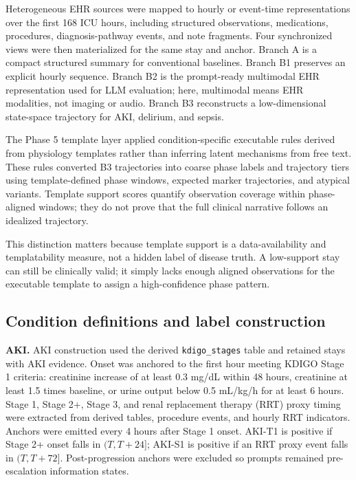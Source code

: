 \documentclass[pdflatex,sn-nature]{sn-jnl}
\begin{document}
Heterogeneous EHR sources were mapped to hourly or event-time representations over the first 168 ICU hours, including structured observations, medications, procedures, diagnosis-pathway events, and note fragments. Four synchronized views were then materialized for the same stay and anchor. Branch A is a compact structured summary for conventional baselines. Branch B1 preserves an explicit hourly sequence. Branch B2 is the prompt-ready multimodal EHR representation used for LLM evaluation; here, multimodal means EHR modalities, not imaging or audio. Branch B3 reconstructs a low-dimensional state-space trajectory for AKI, delirium, and sepsis.

The Phase 5 template layer applied condition-specific executable rules derived from physiology templates rather than inferring latent mechanisms from free text. These rules converted B3 trajectories into coarse phase labels and trajectory tiers using template-defined phase windows, expected marker trajectories, and atypical variants. Template support scores quantify observation coverage within phase-aligned windows; they do not prove that the full clinical narrative follows an idealized trajectory.

This distinction matters because template support is a data-availability and templatability measure, not a hidden label of disease truth. A low-support stay can still be clinically valid; it simply lacks enough aligned observations for the executable template to assign a high-confidence phase pattern.

\subsection{Condition definitions and label construction}

\noindent\textbf{AKI.} AKI construction used the derived \texttt{kdigo\_stages} table and retained stays with AKI evidence. Onset was anchored to the first hour meeting KDIGO Stage 1 criteria: creatinine increase of at least 0.3 mg/dL within 48 hours, creatinine at least 1.5 times baseline, or urine output below 0.5 mL/kg/h for at least 6 hours\cite{kdigo2012aki}. Stage 1, Stage 2+, Stage 3, and renal replacement therapy (RRT) proxy timing were extracted from derived tables, procedure events, and hourly RRT indicators. Anchors were emitted every 4 hours after Stage 1 onset. AKI-T1 is positive if Stage 2+ onset falls in $(T, T+24]$; AKI-S1 is positive if an RRT proxy event falls in $(T, T+72]$. Post-progression anchors were excluded so prompts remained pre-escalation information states.
\end{document}
